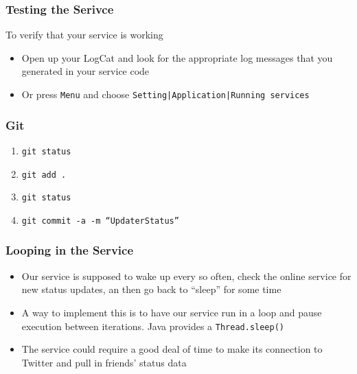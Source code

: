 \begin{frame}
\frametitle{Testing the Serivce}
To verify that your service is working
\begin{itemize}
 \item  Open up your LogCat and look for the appropriate
log messages that you generated in your service code
 \item Or press \texttt{Menu} and choose \texttt{Setting|Application|Running services}
\end{itemize}

\end{frame}
\begin{frame}[fragile]
\frametitle{Git}
\begin{enumerate}
\item \texttt{git status}
\item \texttt{git add .}
\item \texttt{git status}
\item \texttt{git commit -a -m ``UpdaterStatus''}
\end{enumerate}

\end{frame}
\begin{frame}
\frametitle{Looping in the Service}
\begin{itemize}
\item Our service is supposed to wake up every so often, check the online service
for new status updates, an then go back to ``sleep'' for some time
\item A  way to implement this is to have our service run in a loop and pause execution between iterations. Java provides a \texttt{Thread.sleep()}
\item The service could require a good deal of time to make its connection to Twitter and pull in friends’ status data
\end{itemize}


\end{frame}
